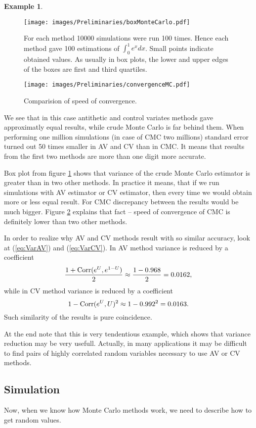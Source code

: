 \documentclass[a4paper,12pt, oneside]{book}
\theoremstyle{definition}
\newtheorem{example}{Example}[chapter]
\theoremstyle{remark}
\def\Corr{{\hbox{Corr}}}
\begin{document}
\begin{example}
\begin{figure}
\centering
 \texttt{[image: images/Preliminaries/boxMonteCarlo.pdf]}
\caption{For each method 10000 simulations were run 100 times. Hence each method gave 100 estimations of $\int_0^1 e^x dx$. Small points indicate obtained values. As usually in box plots, the lower and upper edges of the boxes are first and third quartiles.  }
\label{fig:boxMC}
\end{figure}

\begin{figure}
\centering
 \texttt{[image: images/Preliminaries/convergenceMC.pdf]}
\caption{Comparision of speed of convergence. }
\label{fig:convergenceMC}
\end{figure}

We see that in this case antithetic and control variates methods gave approximatly equal results, while crude Monte Carlo is far behind them. When performing one million simulations (in case of CMC two millions) standard error turned out 50 times smaller in AV and CV than in CMC. It means that results from the first two methods are more than one digit more accurate.

Box plot from figure \ref{fig:boxMC} shows that variance of the crude Monte Carlo estimator is greater than in two other methods. In practice it means, that if we run simulations with AV estimator or CV estimator, then every time we would obtain more or less equal result. For CMC discrepancy between the results would be much bigger.
Figure \ref{fig:convergenceMC} explains that fact -- speed of convergence of CMC is definitely lower than two other methods.

In order to realize why AV and CV methods result with so similar accuracy, look at (\ref{eq:VarAV}) and (\ref{eq:VarCV}). In AV method variance is reduced by a coefficient
\[ \frac{1 + \Corr(e^U, e^{1-U})}{2} \approx \frac{1 - 0.968}{2} = 0.0162, \]
while in CV method variance is reduced by a coefficient
\[ 1 - \Corr(e^U, U)^2 \approx 1 - 0.992^2 = 0.0163. \]
Such similarity of the results is pure coincidence.

At the end note that this is very tendentious example, which shows that variance reduction may be very usefull. Actually, in many applications it may be difficult to find pairs of highly correlated random variables necessary to use AV or CV methods.
\end{example}


\subsection{Simulation}
Now, when we know how Monte Carlo methods work, we need to describe how to get random values.
\end{document}
